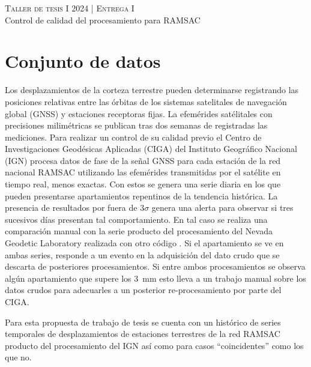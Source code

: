 \documentclass[11pt,spanish,a4paper]{article}
\begin{document}
\begin{center}
  \textsc{\large Taller de tesis I 2024 | Entrega I}\\
	Control de calidad del procesamiento para RAMSAC
\end{center}


\section*{Conjunto de datos}

Los desplazamientos de la corteza terrestre pueden determinarse registrando las posiciones relativas entre las órbitas de los sistemas satelitales de navegación global (GNSS) y estaciones receptoras fijas.
La efemérides satélitales con precisiones milimétricas se publican tras dos semanas de registradas las mediciones.
Para realizar un control de su calidad previo el Centro de Investigaciones Geodésicas Aplicadas (CIGA) del Instituto Geográfico Nacional (IGN) procesa datos de fase de la señal GNSS para cada estación de la red nacional RAMSAC \cite{noauthor_centro_nodate} utilizando las efemérides transmitidas por el satélite en tiempo real, menos exactas.
Con estos se genera una serie diaria en los que pueden presentarse apartamientos repentinos de la tendencia histórica.
La presencia de resultados por fuera de \(3 \sigma\) genera una alerta para observar si tres sucesivos días presentan tal comportamiento.
En tal caso se realiza una comparación manual con la serie producto del procesamiento del Nevada Geodetic Laboratory realizada con otro código \cite{noauthor_magnet_nodate}.
Si el apartamiento se ve en ambas series, responde a un evento en la adquisición del dato crudo que se descarta de posteriores procesamientos.
Si entre ambos procesamientos se observa algún apartamiento que supere los \SI{3}{\milli\metre} esto lleva a un trabajo manual sobre los datos crudos para adecuarles a un posterior re-procesamiento por parte del CIGA. 

Para esta propuesta de trabajo de tesis se cuenta con un histórico de series temporales de desplazamientos de estaciones terrestres de la red RAMSAC producto del procesamiento del IGN así como para casos ``coincidentes'' como los que no.





\end{document}
